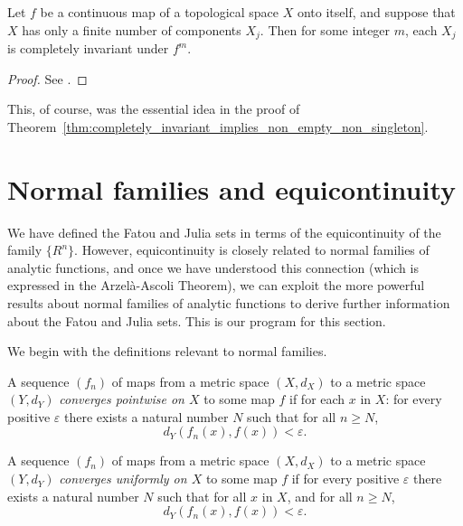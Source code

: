 \begin{proposition}
    \label{prp:finite_number_of_Fatou_components_implies_they_are_periodic}
    Let $f$ be a continuous map of a topological space $X$ onto itself, and
    suppose that $X$ has only a finite number of components $X_j$. Then for some
    integer $m$, each $X_j$ is completely invariant under $f^m$.
\end{proposition}
\begin{proof}
    See \cite[55]{Beardon1991}.
\end{proof}

This, of course, was the essential idea in the proof of
Theorem~\ref{thm:completely_invariant_implies_non_empty_non_singleton}.

\section{Normal families and equicontinuity}
\label{sec:normal_families_and_equicontinuity}

We have defined the Fatou and Julia sets in terms of the equicontinuity of the
family $\{R^n\}$. However, equicontinuity is closely related to normal families
of analytic functions, and once we have understood this connection (which is
expressed in the Arzelà-Ascoli Theorem), we can exploit the more powerful
results about normal families of analytic functions to derive further
information about the Fatou and Julia sets. This is our program for this
section.

We begin with the definitions relevant to normal families.

\begin{definition}
    A sequence $(f_n)$ of maps from a metric space $(X, d_X)$ to a metric space
    $(Y, d_Y)$ \emph{converges pointwise on $X$} to some map $f$ if for each $x$
    in $X$: for every positive $\varepsilon$ there exists a natural number $N$
    such that for all $n \geq N$,
    \begin{equation*}
        d_Y(f_n(x), f(x)) < \varepsilon.
    \end{equation*} 
\end{definition}

\begin{definition}
    A sequence $(f_n)$ of maps from a metric space $(X, d_X)$ to a metric space
    $(Y, d_Y)$ \emph{converges uniformly on $X$} to some map $f$ if for every
    positive $\varepsilon$ there exists a natural number $N$ such that for all
    $x$ in $X$, and for all $n \geq N$,
    \begin{equation*}
        d_Y(f_n(x), f(x)) < \varepsilon.
    \end{equation*}
\end{definition}

